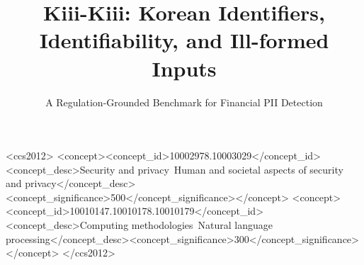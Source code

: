 \documentclass[sigconf,anonymous]{acmart}
\begin{document}
\newcommand{\kiii}{Kiii\textsuperscript{2}}
\title[Kiii-Kiii: Korean Financial PII Detection]{Kiii-Kiii: Korean Identifiers, Identifiability, and Ill-formed Inputs}
\subtitle{A Regulation-Grounded Benchmark for Financial PII Detection}

\begin{abstract}

\end{abstract}

\begin{CCSXML}
<ccs2012>
<concept><concept_id>10002978.10003029</concept_id><concept_desc>Security and privacy~Human and societal aspects of security and privacy</concept_desc><concept_significance>500</concept_significance></concept>
<concept><concept_id>10010147.10010178.10010179</concept_id><concept_desc>Computing methodologies~Natural language processing</concept_desc><concept_significance>300</concept_significance></concept>
</ccs2012>
\end{CCSXML}

\maketitle





\end{document}
